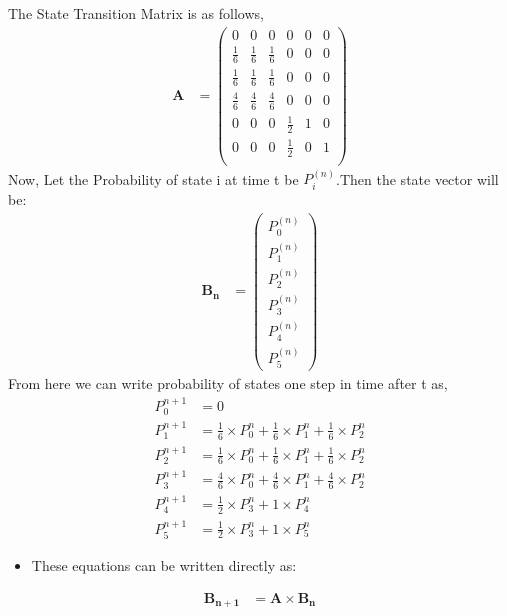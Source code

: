 \documentclass[journal,12pt,onecolumn]{IEEEtran}
\begin{document}
The State Transition Matrix is as follows,
\begin{align}
\textbf{A} &= 
\begin{pmatrix}
0 & 0 & 0 & 0 & 0 & 0 \\[4pt] 
\frac{1}{6} & \frac{1}{6} & \frac{1}{6} & 0 & 0 & 0 \\[4pt]
\frac{1}{6} & \frac{1}{6} & \frac{1}{6} & 0 & 0 & 0 \\[4pt]
\frac{4}{6} & \frac{4}{6} & \frac{4}{6} & 0 & 0 & 0 \\[4pt]
0 & 0 & 0 & \frac{1}{2} & 1 & 0 \\[4pt]
0 & 0 & 0 & \frac{1}{2} & 0 & 1 \\[4pt]
\end{pmatrix}
\end{align}
Now, Let the Probability of state i at time t be $P_{i}^{(n)}$.Then the state vector will be: 
\begin{align}
\label{eq:5}
\mathbf{B_{n}} &= 
\begin{pmatrix}
P_{0}^{(n)} \\[2pt]
P_{1}^{(n)} \\[2pt]
P_{2}^{(n)} \\[2pt]
P_{3}^{(n)} \\[2pt]
P_{4}^{(n)} \\[2pt]
P_{5}^{(n)}
\end{pmatrix}
\end{align}
From here we can write probability of states one step in time after t as,
\begin{align}
    P_{0}^{n+1} &= 0 \\
    P_{1}^{n+1} &= \frac{1}{6} \times P_{0}^{n} + \frac{1}{6} \times P_{1}^{n} + \frac{1}{6} \times P_{2}^{n} \\ 
    P_{2}^{n+1} &=  \frac{1}{6} \times P_{0}^{n} + \frac{1}{6} \times P_{1}^{n} + \frac{1}{6} \times P_{2}^{n}\\
    P_{3}^{n+1} &= \frac{4}{6} \times P_{0}^{n} + \frac{4}{6} \times P_{1}^{n} + \frac{4}{6} \times P_{2}^{n}  \\
    P_{4}^{n+1} &= \frac{1}{2} \times P_{3}^{n} + 1 \times P_{4}^{n}   \\
    P_{5}^{n+1} &= \frac{1}{2} \times P_{3}^{n} + 1 \times P_{5}^{n}  
\end{align}
\begin{itemize}
    \item These equations can be written directly as:
\end{itemize}
\begin{align}
   \label{1}
    \mathbf{B_{n+1}} &= \mathbf{A} \times \mathbf{B_{n}}
\end{align}
\end{document}
